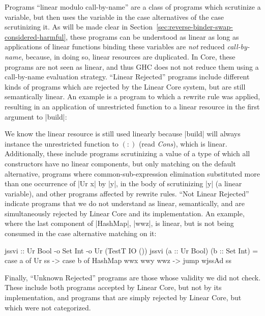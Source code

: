 \documentclass[acmsmall, screen, review]{acmart}
\begin{document}
Programs ``linear modulo call-by-name'' are a class of programs
which scrutinize a variable, but then uses the variable in the case
alternatives of the case scrutinizing it. As will be made clear in
Section~\ref{sec:reverse-binder-swap-considered-harmful}, these programs can be
understood as linear as long as applications of linear functions binding these
variables are \emph{not} reduced \emph{call-by-name}, because, in doing so,
linear resources are duplicated. In Core, these programs are not seen as
linear, and thus GHC does not not reduce them using a call-by-name evaluation strategy.
%
``Linear Rejected'' programs include different kinds of programs which are
rejected by the Linear Core system, but are still semantically linear. An
example is a program to which a rewrite rule was applied, resulting in an
application of unrestricted function to a linear resource in the first argument
to |build|:
We know the linear resource is still used linearly because |build| will
always instance the unrestricted function to $(:)$ (read \emph{Cons}), which is
linear. Additionally, these include programs scrutinizing a value of a type of
which all constructors have no linear components, but only matching on the
default alternative, programs where common-sub-expression elimination
substituted more than one occurrence of |Ur x| by |y|, in the body of
scrutinizing |y| (a linear variable), and other programs affected by rewrite rules.
%
``Not Linear Rejected'' indicate programs that we do not understand as linear,
semantically, and are simultaneously rejected by Linear Core and its
implementation. An example, where the last component of |HashMap|, |wwz|,
is linear, but is not being consumed in the case alternative matching on it:
\begin{code}
jssvi :: Ur Bool -o Set Int -o Ur (TestT IO ())
jssvi (a :: Ur Bool) (b :: Set Int)
  = case a of
    Ur ss -> case b  of
      HashMap wwx wwy wwz ->
        jump wjssAd ss
\end{code}
%
Finally, ``Unknown Rejected'' programs are those whose validity we did not
check. These include both programs accepted by Linear Core, but not by its
implementation, and programs that are simply rejected by Linear Core, but which
were not categorized.
\end{document}
